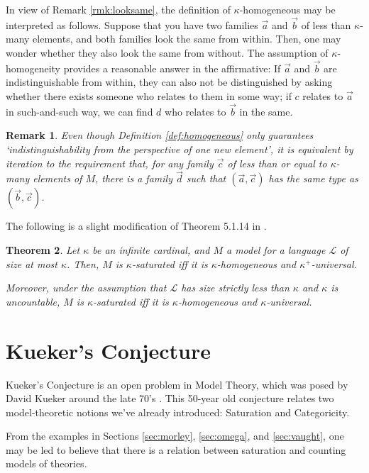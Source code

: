 \documentclass{article}
\newtheorem{theorem}{Theorem}[section]
\newtheorem{remark}[theorem]{Remark}
\theoremstyle{nonumberplain}
\newcommand{\Lang}{\mathcal{L}}
\begin{document}
In view of Remark \ref{rmk:looksame}, the definition of $\kappa$-homogeneous may be interpreted as follows. Suppose that you have two families $\vec a$ and $\vec b$ of less than $\kappa$-many elements, and both families look the same from within. Then, one may wonder whether they also look the same from without. The assumption of $\kappa$-homogeneity provides a reasonable answer in the affirmative: If $\vec a$ and $\vec b$ are indistinguishable from within, they can also not be distinguished by asking whether there exists someone who relates to them in some way; if $c$ relates to $\vec a$ in such-and-such way, we can find $d$ who relates to $\vec b$ in the same.

\begin{remark}
Even though Definition \ref{def:homogeneous} only guarantees `indistinguishability from the perspective of one new element', it is equivalent by iteration to the requirement that, for any family $\vec c$ of less than \emph{or equal to} $\kappa$-many elements of $M$, there is a family $\vec d$ such that $(\vec a, \vec c)$ has the same type as $(\vec b, \vec c)$.
\end{remark}

The following is a slight modification of Theorem 5.1.14 in \cite{cnk}.

\begin{theorem}
Let $\kappa$ be an infinite cardinal, and $M$ a model for a language $\Lang$ of size at most $\kappa$. Then, $M$ is $\kappa$-saturated iff it is $\kappa$-homogeneous and $\kappa^+$-universal.

Moreover, under the assumption that $\Lang$ has size \emph{strictly less than} $\kappa$ and $\kappa$ is uncountable, $M$ is $\kappa$-saturated iff it is $\kappa$-homogeneous and $\kappa$-universal.
\end{theorem}

\section{Kueker's Conjecture}\label{sec:kueker}

Kueker's Conjecture is an open problem in Model Theory, which was posed by David Kueker around the late 70's \cite{kuekersuperstable}. This 50-year old conjecture relates two model-theoretic notions we've already introduced: Saturation and Categoricity.

From the examples in Sections \ref{sec:morley}, \ref{sec:omega}, and \ref{sec:vaught}, one may be led to believe that there is a relation between saturation and counting models of theories.
\end{document}
